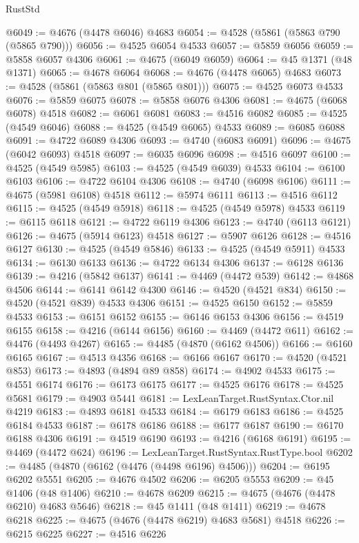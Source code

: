 \begin{lexlean}{RustStd}
\begin{coremodule}
@6049 := @4676 (@4478 @6046) @4683
@6054 := @4528 (@5861 (@5863 @790 (@5865 @790)))
@6056 := @4525 @6054 @4533
@6057 := @5859 @6056
@6059 := @5858 @6057 @4306
@6061 := @4675 (@6049 @6059)
@6064 := @45 @1371 (@48 @1371)
@6065 := @4678 @6064
@6068 := @4676 (@4478 @6065) @4683
@6073 := @4528 (@5861 (@5863 @801 (@5865 @801)))
@6075 := @4525 @6073 @4533
@6076 := @5859 @6075
@6078 := @5858 @6076 @4306
@6081 := @4675 (@6068 @6078) @4518
@6082 := @6061 @6081
@6083 := @4516 @6082
@6085 := @4525 (@4549 @6046)
@6088 := @4525 (@4549 @6065) @4533
@6089 := @6085 @6088
@6091 := @4722 @6089 @4306
@6093 := @4740 (@6083 @6091)
@6096 := @4675 (@6042 @6093) @4518
@6097 := @6035 @6096
@6098 := @4516 @6097
@6100 := @4525 (@4549 @5985)
@6103 := @4525 (@4549 @6039) @4533
@6104 := @6100 @6103
@6106 := @4722 @6104 @4306
@6108 := @4740 (@6098 @6106)
@6111 := @4675 (@5981 @6108) @4518
@6112 := @5974 @6111
@6113 := @4516 @6112
@6115 := @4525 (@4549 @5918)
@6118 := @4525 (@4549 @5978) @4533
@6119 := @6115 @6118
@6121 := @4722 @6119 @4306
@6123 := @4740 (@6113 @6121)
@6126 := @4675 (@5914 @6123) @4518
@6127 := @5907 @6126
@6128 := @4516 @6127
@6130 := @4525 (@4549 @5846)
@6133 := @4525 (@4549 @5911) @4533
@6134 := @6130 @6133
@6136 := @4722 @6134 @4306
@6137 := @6128 @6136
@6139 := @4216 (@5842 @6137)
@6141 := @4469 (@4472 @539)
@6142 := @4868 @4506
@6144 := @6141 @6142 @4300
@6146 := @4520 (@4521 @834)
@6150 := @4520 (@4521 @839) @4533 @4306
@6151 := @4525 @6150
@6152 := @5859 @4533
@6153 := @6151 @6152
@6155 := @6146 @6153 @4306
@6156 := @4519 @6155
@6158 := @4216 (@6144 @6156)
@6160 := @4469 (@4472 @611)
@6162 := @4476 (@4493 @4267)
@6165 := @4485 (@4870 (@6162 @4506))
@6166 := @6160 @6165
@6167 := @4513 @4356
@6168 := @6166 @6167
@6170 := @4520 (@4521 @853)
@6173 := @4893 (@4894 @89 @858)
@6174 := @4902 @4533
@6175 := @4551 @6174
@6176 := @6173 @6175
@6177 := @4525 @6176
@6178 := @4525 @5681
@6179 := @4903 @5441
@6181 := LexLeanTarget.RustSyntax.Ctor.nil @4219
@6183 := @4893 @6181 @4533
@6184 := @6179 @6183
@6186 := @4525 @6184 @4533
@6187 := @6178 @6186
@6188 := @6177 @6187
@6190 := @6170 @6188 @4306
@6191 := @4519 @6190
@6193 := @4216 (@6168 @6191)
@6195 := @4469 (@4472 @624)
@6196 := LexLeanTarget.RustSyntax.RustType.bool
@6202 := @4485 (@4870 (@6162 (@4476 (@4498 @6196) @4506)))
@6204 := @6195 @6202 @5551
@6205 := @4676 @4502
@6206 := @6205 @5553
@6209 := @45 @1406 (@48 @1406)
@6210 := @4678 @6209
@6215 := @4675 (@4676 (@4478 @6210) @4683 @5646)
@6218 := @45 @1411 (@48 @1411)
@6219 := @4678 @6218
@6225 := @4675 (@4676 (@4478 @6219) @4683 @5681) @4518
@6226 := @6215 @6225
@6227 := @4516 @6226

\end{coremodule}
\end{lexlean}
